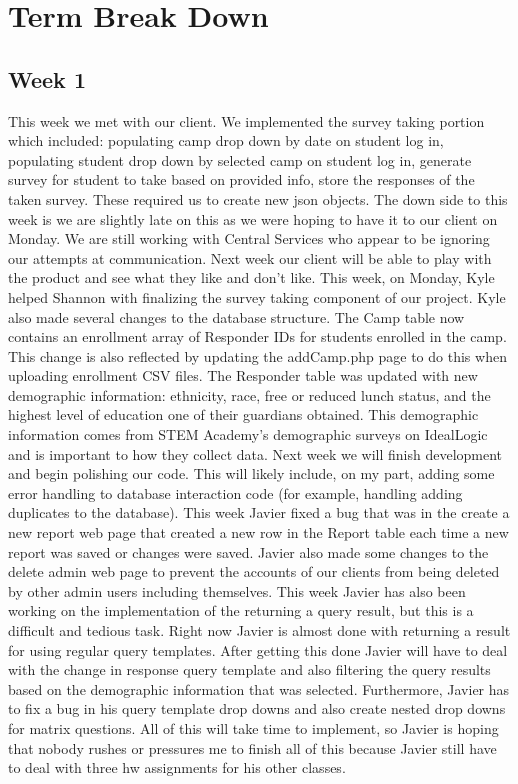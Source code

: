 \documentclass[letterpaper,10pt,serif,draftclsnofoot,onecolumn,compsoc,titlepage]{IEEEtran}
\begin{document}
\section{Term Break Down}
\subsection{Week 1}
This week we met with our client. We implemented the survey taking portion which included: 
populating camp drop down by date on student log in,
populating student drop down by selected camp on student log in,
generate survey for student to take based on provided info,
store the responses of the taken survey. These required us to create new json objects. 
The down side to this week is we are slightly late on this as we were hoping to have it to our client on Monday.
 We are still working with Central Services who appear to be ignoring our attempts at communication.
 Next week our client will be able to play with the product and see what they like and don't like.
 This week, on Monday, Kyle helped Shannon with finalizing the survey taking component of our project.
Kyle also made several changes to the database structure. The Camp table now contains an enrollment array
 of Responder IDs for students enrolled in the camp. This change is also reflected by updating the
 addCamp.php page to do this when uploading enrollment CSV files. The Responder table was updated
 with new demographic information: ethnicity, race, free or reduced lunch status, and the highest
 level of education one of their guardians obtained. This demographic information comes from STEM Academy's
 demographic surveys on IdealLogic and is important to how they collect data.
Next week we will finish development and begin polishing our code. This will likely include,
 on my part, adding some error handling to database interaction code (for example, handling adding 
 duplicates to the database).
This week Javier fixed a bug that was in the create a new report web page that created a new row in 
the Report table each time a new report was saved or changes were saved. Javier also made some changes
 to the delete admin web page to prevent the accounts of our clients from being deleted by other admin
 users including themselves. This week Javier has also been working on the implementation of the returning
 a query result, but this is a difficult and tedious task. Right now Javier is almost done with returning
 a result for using regular query templates. After getting this done Javier will have to deal with the
 change in response query template and also filtering the query results based on the demographic
 information that was selected. Furthermore, Javier has to fix a bug in his query template drop downs
 and also create nested drop downs for matrix questions. All of this will take time to implement, so Javier
 is hoping that nobody rushes or pressures me to finish all of this because Javier still have to deal with
 three hw assignments for his other classes.
\end{document}
